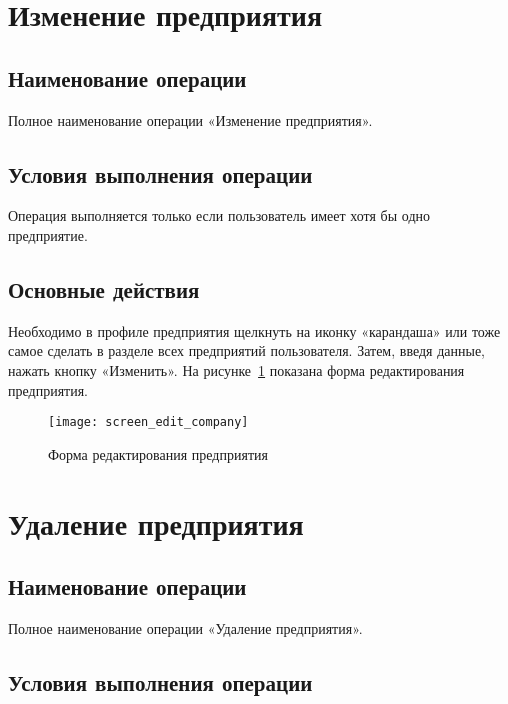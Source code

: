 \documentclass[a4paper]{G2-105}
\begin{document}
\section{Изменение предприятия}

\ttl

\subsection{Наименование операции}

Полное наименование операции «Изменение предприятия».

\subsection{Условия выполнения операции}

Операция выполняется только если пользователь имеет хотя бы одно предприятие.

\subsection{Основные действия}

Необходимо в профиле предприятия щелкнуть на иконку «карандаша» или тоже самое сделать в разделе всех предприятий пользователя. Затем, введя данные, нажать кнопку «Изменить». На рисунке~\ref{fig:screen_edit_company} показана форма редактирования предприятия.

\begin{figure}[H]
\centering
\texttt{[image: screen\_edit\_company]}
\caption{Форма редактирования предприятия}
\label{fig:screen_edit_company}
\end{figure}

\section{Удаление предприятия}

\ttl

\subsection{Наименование операции}

Полное наименование операции «Удаление предприятия».

\subsection{Условия выполнения операции}
\end{document}
